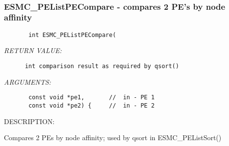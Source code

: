 \mbox{}\hrulefill\ 
 
\subsubsection{ESMC\_PEListPECompare - compares 2 PE's by node affinity}


  
\begin{verbatim}       int ESMC_PEListPECompare(\end{verbatim}{\em RETURN VALUE:}
\begin{verbatim}      int comparison result as required by qsort()\end{verbatim}{\em ARGUMENTS:}
\begin{verbatim}       const void *pe1,       //  in - PE 1
       const void *pe2) {     //  in - PE 2\end{verbatim}
{\sf DESCRIPTION:\\ }


        Compares 2 PEs by node affinity; used by qsort in ESMC\_PEListSort()
  
